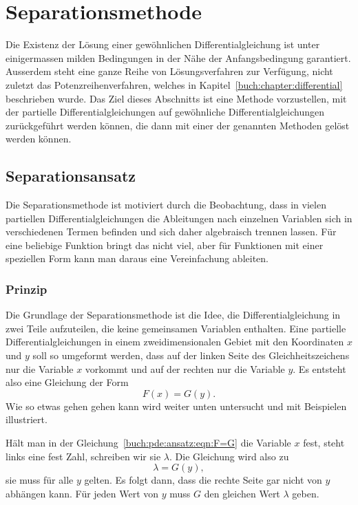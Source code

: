 %
%
%
\section{Separationsmethode
\label{buch:pde:section:separation}}
Die Existenz der Lösung einer gewöhnlichen Differentialgleichung
ist unter einigermassen milden Bedingungen in der Nähe der
Anfangsbedingung garantiert.
Ausserdem steht eine ganze Reihe von Lösungsverfahren zur
Verfügung, nicht zuletzt das Potenzreihenverfahren, welches in
Kapitel~\ref{buch:chapter:differential} beschrieben wurde.
Das Ziel dieses Abschnitts ist eine Methode vorzustellen, mit
der partielle Differentialgleichungen auf gewöhnliche
Differentialgleichungen zurückgeführt werden können,
die dann mit einer der genannten Methoden gelöst werden können.

%
%
\subsection{Separationsansatz}
Die Separationsmethode ist motiviert durch die Beobachtung, dass in
vielen partiellen Differentialgleichungen die Ableitungen nach
einzelnen Variablen sich in verschiedenen Termen befinden und
sich daher algebraisch trennen lassen.
Für eine beliebige Funktion bringt das nicht viel, aber für
Funktionen mit einer speziellen Form kann man daraus eine Vereinfachung
ableiten.

%
%
\subsubsection{Prinzip}
Die Grundlage der Separationsmethode ist die Idee, die Differentialgleichung
in zwei Teile aufzuteilen, die keine gemeinsamen Variablen enthalten.
Eine partielle Differentialgleichungen in einem zweidimensionalen
Gebiet mit den Koordinaten $x$ und $y$ soll so umgeformt
werden, dass auf der linken Seite des Gleichheitszeichens nur
die Variable $x$ vorkommt und auf der rechten nur die Variable $y$.
Es entsteht also eine Gleichung der Form
\begin{equation}
F(x) = G(y).
\label{buch:pde:ansatz:eqn:F=G}
\end{equation}
Wie so etwas gehen gehen kann wird weiter unten untersucht und
mit Beispielen illustriert.

Hält man in der Gleichung~\eqref{buch:pde:ansatz:eqn:F=G}
die Variable $x$ fest, steht links eine fest Zahl, schreiben wir 
sie $\lambda$.
Die Gleichung wird also zu
\[
\lambda = G(y),
\]
sie muss für alle $y$ gelten.
Es folgt dann, dass die rechte Seite gar nicht von $y$ abhängen kann.
Für jeden Wert von $y$ muss $G$ den gleichen Wert $\lambda$ geben.

